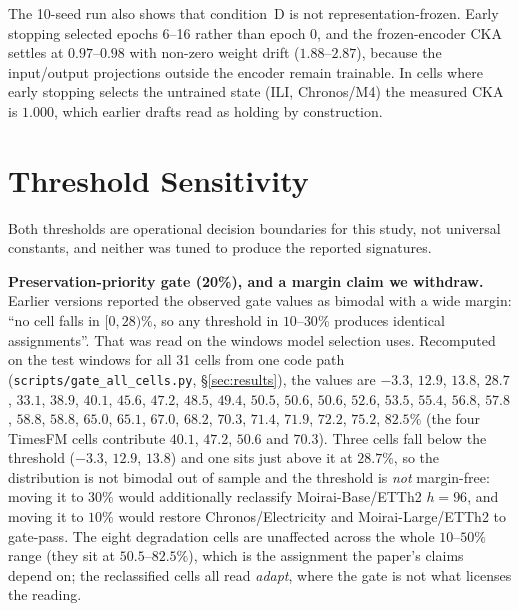 \documentclass{article}
\begin{document}
The 10-seed run also shows that condition~D is not representation-frozen. Early stopping selected
epochs 6--16 rather than epoch 0, and the frozen-encoder CKA settles at $0.97$--$0.98$ with
non-zero weight drift ($1.88$--$2.87$), because the input/output projections outside the encoder
remain trainable. In cells where early stopping selects the untrained state (ILI, Chronos/M4)
the measured CKA is $1.000$, which earlier drafts read as holding by construction.

\section{Threshold Sensitivity}
\label{app:thresholds}

Both thresholds are operational decision boundaries for this study, not universal constants, and neither was tuned to produce the reported signatures.

\textbf{Preservation-priority gate (20\%), and a margin claim we withdraw.}
Earlier versions reported the observed gate values as bimodal with a wide margin: ``no cell falls in
$[0,28)\%$, so any threshold in $10$--$30\%$ produces identical assignments''. That was read on the
windows model selection uses. Recomputed on the test windows for all 31 cells from one code path
(\texttt{scripts/gate\_all\_cells.py}, \S\ref{sec:results}), the values are
$-3.3$, $12.9$, $13.8$, $28.7$, $33.1$, $38.9$, $40.1$, $45.6$, $47.2$, $48.5$, $49.4$, $50.5$,
$50.6$, $50.6$, $52.6$, $53.5$, $55.4$, $56.8$, $57.8$, $58.8$, $58.8$, $65.0$, $65.1$, $67.0$,
$68.2$, $70.3$, $71.4$, $71.9$, $72.2$, $75.2$, $82.5\%$
(the four TimesFM cells contribute $40.1$, $47.2$, $50.6$ and $70.3$). Three cells fall below the threshold
($-3.3$, $12.9$, $13.8$) and one sits just above it at $28.7\%$, so the distribution is not bimodal
out of sample and the threshold is \emph{not}
margin-free: moving it to $30\%$ would additionally reclassify Moirai-Base/ETTh2 $h{=}96$, and moving
it to $10\%$ would restore Chronos/Electricity and Moirai-Large/ETTh2 to gate-pass. The eight
degradation cells are unaffected across the whole $10$--$50\%$ range (they sit at $50.5$--$82.5\%$),
which is the assignment the paper's claims depend on; the reclassified cells all read
\emph{adapt}, where the gate is not what licenses the reading.
\end{document}
